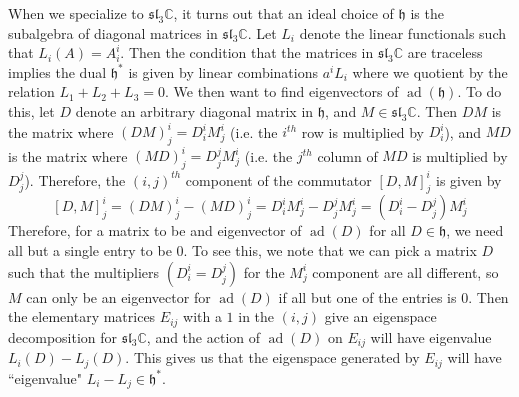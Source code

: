 \documentclass[psamsfonts]{amsart}
\theoremstyle{definition}
\theoremstyle{remark}
\renewcommand{\sl}{\mathfrak{sl}}
\newcommand{\C}{\mathbb{C}}
\newcommand{\h}{\mathfrak{h}}
\DeclareMathOperator{\ad}{ad}
\begin{document}
When we specialize to $\sl_3\C$, it turns out that an ideal choice of $\h$ is
the subalgebra of diagonal matrices in $\sl_3\C$. Let $L_i$ denote the linear
functionals such that $L_i(A) = A^i_i$. Then the condition that the matrices
in $\sl_3\C$ are traceless implies the dual $\h^*$ is given by linear
combinations $a^iL_i$ where we quotient by the relation $L_1 + L_2 + L_3 = 0$.
We then want to find eigenvectors of $\ad(\h)$. To do this, let $D$ denote
an arbitrary diagonal matrix in $\h$, and $M \in \sl_3\C$. Then $DM$ is the
matrix where $(DM)^i_j = D^i_iM^i_j$ (i.e. the $i^{th}$ row is multiplied by
$D^i_i$), and $MD$ is the matrix where $(MD)^i_j = D^j_jM^i_j$ (i.e. the $j^{th}$
column of $MD$ is multiplied by $D^j_j$). Therefore, the $(i,j)^{th}$ component
of the commutator $[D,M]^i_j$ is given by
\[
[D,M]^i_j = (DM)^i_j - (MD)^i_j = D^i_iM^i_j - D^j_jM^i_j = (D^i_i - D^j_j)M^i_j
\]
Therefore, for a matrix to be and eigenvector of $\ad(D)$ for all $D \in \h$, we
need all but a single entry to be $0$. To see this, we note that we can pick
a matrix $D$ such that the multipliers $(D^i_i = D^j_j)$ for the $M^i_j$
component are all different, so $M$ can only be an eigenvector for $\ad(D)$
if all but one of the entries is $0$. Then the elementary matrices $E_{ij}$ with
a $1$ in the $(i,j)$ give an eigenspace decomposition for $\sl_3\C$, and the
action of $\ad(D)$ on $E_{ij}$ will have eigenvalue $L_i(D) - L_j(D)$. This gives
us that the eigenspace generated by $E_{ij}$ will have ``eigenvalue"
$L_i - L_j \in \h^*$.
%
\iffalse
\center
\scalebox{3}{
  \begin{tikzpicture}[baseline=-.5]
  \begin{rootSystem}{A}
  \roots
  \end{rootSystem}
  \end{tikzpicture}
}
\fi
%
\end{document}
